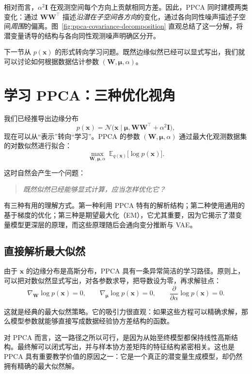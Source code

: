 相对而言，\(\alpha^2\mathbf{I}\) 在观测空间每个方向上贡献相同方差。因此，PPCA 同时建模两类变化：通过 \(\mathbf{W}\mathbf{W}^\top\) 描述\emph{沿潜在子空间各方向}的变化，通过各向同性噪声描述子空间\emph{周围}的偏离。图~\ref{fig:ppca-covariance-decomposition} 直观总结了这一分解，将潜变量诱导的结构与各向同性观测噪声明确区分开。



\bigskip

下一节从 \(p(\mathbf{x})\) 的形式转向学习问题。既然边缘似然已经可以显式写出，我们就可以讨论如何根据数据估计参数 \((\mathbf{W},\boldsymbol{\mu},\alpha)\)。

\section{学习 PPCA：三种优化视角}

我们已经推导出边缘分布
\[
p(\mathbf{x})
=
\mathcal{N}\!\bigl(
\mathbf{x}\mid
\boldsymbol{\mu},
\mathbf{W}\mathbf{W}^\top+\alpha^2\mathbf{I}
\bigr),
\]
现在可以从“表示”转向“学习”。PPCA 的参数 \((\mathbf{W},\boldsymbol{\mu},\alpha)\) 通过最大化观测数据集的对数似然进行拟合：
\[
\max_{\mathbf{W},\boldsymbol{\mu},\alpha}
\;
\mathbb{E}_{q(\mathbf{x})}\big[\log p(\mathbf{x})\big].
\]

这时自然会产生一个问题：
\begin{quote}
\emph{既然似然已经能够显式计算，应当怎样优化它？}
\end{quote}
有三种有用的理解方式。第一种利用 PPCA 特有的解析结构；第二种使用通用的基于梯度的优化；第三种是期望最大化（EM），它尤其重要，因为它揭示了潜变量模型更深层的原理，而这些原理随后会通向变分推断与 VAE。

\subsection{直接解析最大似然}

由于 \(\mathbf{x}\) 的边缘分布是高斯分布，PPCA 具有一条异常简洁的学习路径。原则上，可以把对数似然显式写出，对各参数求导，把导数设为零，再求解驻点：
\[
\nabla_{\mathbf{W}}\log p(\mathbf{x})=0,
\qquad
\nabla_{\boldsymbol{\mu}}\log p(\mathbf{x})=0,
\qquad
\frac{\partial}{\partial\alpha}\log p(\mathbf{x})=0.
\]

这就是经典的最大似然策略。它的吸引力很直观：如果这些方程可以精确求解，那么模型参数就能够直接写成数据经验协方差结构的函数。

对 PPCA 而言，这一路径之所以可行，是因为从始至终模型都保持线性高斯结构。最终解可以闭式写出，并与样本协方差矩阵的特征结构紧密相关。这也是 PPCA 具有重要教学价值的原因之一：它是一个真正的潜变量生成模型，却仍然拥有精确的最大似然解。

